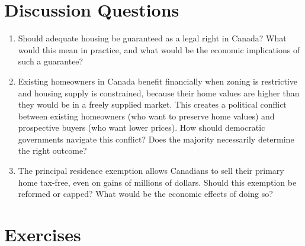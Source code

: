 \section*{Discussion Questions}

\begin{enumerate}

\item Should adequate housing be guaranteed as a legal right in Canada? What would this mean in practice, and what would be the economic implications of such a guarantee?

\item Existing homeowners in Canada benefit financially when zoning is restrictive and housing supply is constrained, because their home values are higher than they would be in a freely supplied market. This creates a political conflict between existing homeowners (who want to preserve home values) and prospective buyers (who want lower prices). How should democratic governments navigate this conflict? Does the majority necessarily determine the right outcome?

\item The principal residence exemption allows Canadians to sell their primary home tax-free, even on gains of millions of dollars. Should this exemption be reformed or capped? What would be the economic effects of doing so?

\end{enumerate}

\section*{Exercises}

